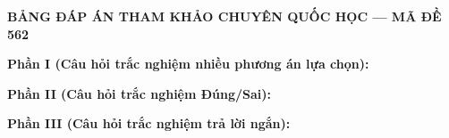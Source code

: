 
\newpage
\begin{center} \textbf{BẢNG ĐÁP ÁN THAM KHẢO CHUYÊN QUỐC HỌC --- MÃ ĐỀ 562} \end{center}

\noindent \textbf{Phần I (Câu hỏi trắc nghiệm nhiều phương án lựa chọn):}  

\noindent \textbf{Phần II (Câu hỏi trắc nghiệm Đúng/Sai):}

\noindent \textbf{Phần III (Câu hỏi trắc nghiệm trả lời ngắn):}

\label{B\thedeso}